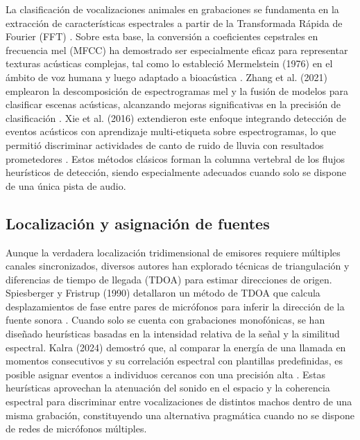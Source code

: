 La clasificación de vocalizaciones animales en grabaciones 
se fundamenta en la extracción de características 
espectrales a partir de la Transformada Rápida de Fourier 
(FFT) \cite{cooley1965algorithm}. Sobre esta base, la conversión a 
coeficientes cepstrales en frecuencia mel (MFCC) ha 
demostrado ser especialmente eficaz para representar texturas 
acústicas complejas, tal como lo estableció Mermelstein 
(1976) en el ámbito de voz humana y luego adaptado a 
bioacústica \cite{mermelstein1976distance}. Zhang et al. (2021) 
emplearon la descomposición de espectrogramas mel y la fusión de 
modelos para clasificar escenas acústicas, alcanzando mejoras 
significativas en la precisión de clasificación 
\cite{zhang2021acoustic}. Xie et al. (2016) extendieron este 
enfoque integrando detección de eventos acústicos con 
aprendizaje multi-etiqueta sobre espectrogramas, lo que 
permitió discriminar actividades de canto de ruido de lluvia 
con resultados prometedores \cite{xie2016detecting}. 
Estos métodos clásicos forman la columna vertebral de los 
flujos heurísticos de detección, siendo especialmente 
adecuados cuando solo se dispone de una única pista de audio.

\subsection{Localización y asignación de fuentes}
Aunque la verdadera localización tridimensional de emisores 
requiere múltiples canales sincronizados, diversos autores 
han explorado técnicas de triangulación y diferencias de 
tiempo de llegada (TDOA) para estimar direcciones de origen. 
Spiesberger y Fristrup (1990) detallaron un método de TDOA 
que calcula desplazamientos de fase entre pares de micrófonos 
para inferir la dirección de la fuente sonora 
\cite{spiesberger1990passive}. Cuando solo se cuenta 
con grabaciones monofónicas, se han diseñado heurísticas 
basadas en la intensidad relativa de la señal y la similitud 
espectral. Kalra (2024) demostró que, al comparar la energía 
de una llamada en momentos consecutivos y su correlación 
espectral con plantillas predefinidas, es posible asignar 
eventos a individuos cercanos con una precisión alta
\cite{kalra2024signal}. Estas heurísticas aprovechan la atenuación 
del sonido en el espacio y la coherencia espectral para 
discriminar entre vocalizaciones de distintos machos dentro 
de una misma grabación, constituyendo una alternativa 
pragmática cuando no se dispone de redes de micrófonos 
múltiples.



